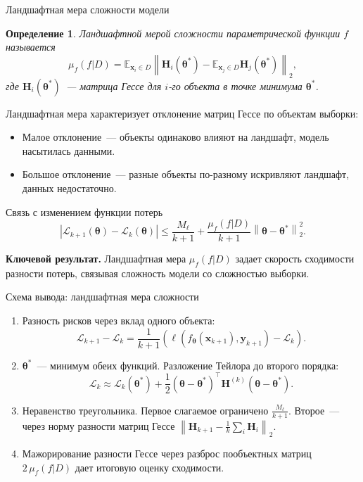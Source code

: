 \documentclass[10pt,pdf,hyperref={unicode}]{beamer}
\newtheorem{rusdefinition}{Определение}
\newcommand{\key}[1]{\textbf{\color{darkgreen}#1}}
\begin{document}
\begin{frame}{Ландшафтная мера сложности модели}
\justifying

\begin{rusdefinition}
\justifying
    Ландшафтной мерой сложности параметрической функции $f$ называется
    \[
        \mu_f(f|D) = \mathbb{E}_{\mathbf{x}_i\in D}\left\| \mathbf{H}_i(\boldsymbol{\theta}^*) - \mathbb{E}_{\mathbf{x}_j\in D}\mathbf{H}_j(\boldsymbol{\theta}^*) \right\|_2,
    \]
    где $\mathbf{H}_i(\boldsymbol{\theta}^*)$~--- матрица Гессе для $i$-го объекта в точке минимума $\boldsymbol{\theta}^*$.
\end{rusdefinition}

Ландшафтная мера характеризует отклонение матриц Гессе по объектам выборки:
\begin{itemize}
    \item Малое отклонение~--- объекты одинаково влияют на ландшафт, модель насытилась данными.
    \item Большое отклонение~--- разные объекты по-разному искривляют ландшафт, данных недостаточно.
\end{itemize}

\begin{block}{Связь с изменением функции потерь}
\[
    \left| \mathcal{L}_{k+1}(\boldsymbol{\theta}) - \mathcal{L}_k(\boldsymbol{\theta}) \right| \leqslant \frac{M_{\ell}}{k+1}+ \frac{\mu_f(f|D)}{k+1}\left\|\boldsymbol{\theta} - \boldsymbol{\theta}^*\right\|_2^2.
\]
\end{block}

\vspace{0.15em}
\key{Ключевой результат.} Ландшафтная мера $\mu_f(f|D)$ задает скорость сходимости разности потерь, связывая сложность модели со сложностью выборки.
\end{frame}
\begin{frame}{Схема вывода: ландшафтная мера сложности}
\justifying
\small
\begin{enumerate}
    \item Разность рисков через вклад одного объекта:
    \[
        \mathcal{L}_{k+1}-\mathcal{L}_k = \frac{1}{k+1}\left(\ell(f_{\boldsymbol{\theta}}(\mathbf{x}_{k+1}),\mathbf{y}_{k+1})-\mathcal{L}_k\right).
    \]
    \item $\boldsymbol{\theta}^*$~--- минимум обеих функций. Разложение Тейлора до второго порядка:
    \[
        \mathcal{L}_k \approx \mathcal{L}_k(\boldsymbol{\theta}^*) + \frac{1}{2}(\boldsymbol{\theta}-\boldsymbol{\theta}^*)^\top\mathbf{H}^{(k)}(\boldsymbol{\theta}-\boldsymbol{\theta}^*).
    \]
    \item Неравенство треугольника. Первое слагаемое ограничено $\frac{M_\ell}{k+1}$. Второе~--- через норму разности матриц Гессе $\left\|\mathbf{H}_{k+1}-\frac{1}{k}\sum_i\mathbf{H}_i\right\|_2$.
    \item Мажорирование разности Гессе через разброс пообъектных матриц $2\,\mu_f(f|D)$ дает итоговую оценку сходимости.
\end{enumerate}
\end{frame}
\end{document}
